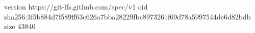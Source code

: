 version https://git-lfs.github.com/spec/v1
oid sha256:3f5b884d7f589ff63c626a7bba28229fbc8973261f69d78a5997544de6d82bdb
size 43840
